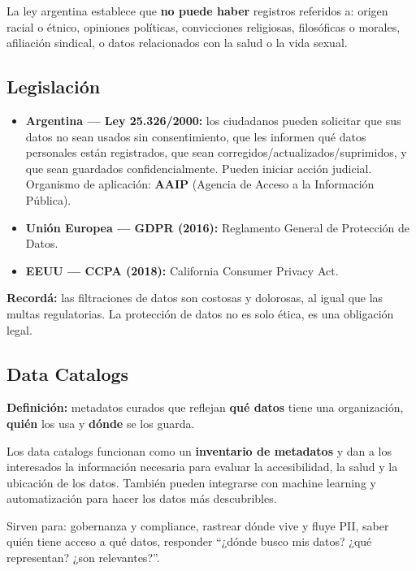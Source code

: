\documentclass[11pt, a4paper]{article}
\begin{document}
La ley argentina establece que \textbf{no puede haber} registros referidos a: origen racial o étnico, opiniones políticas, convicciones religiosas, filosóficas o morales, afiliación sindical, o datos relacionados con la salud o la vida sexual.

\subsection{Legislación}

\begin{itemize}
	\item \textbf{Argentina --- Ley 25.326/2000:} los ciudadanos pueden solicitar que sus datos no sean usados sin consentimiento, que les informen qué datos personales están registrados, que sean corregidos/actualizados/suprimidos, y que sean guardados confidencialmente. Pueden iniciar acción judicial. Organismo de aplicación: \textbf{AAIP} (Agencia de Acceso a la Información Pública).
	\item \textbf{Unión Europea --- GDPR (2016):} Reglamento General de Protección de Datos.
	\item \textbf{EEUU --- CCPA (2018):} California Consumer Privacy Act.
\end{itemize}

\begin{recallbox}
	\textbf{Recordá:} las filtraciones de datos son costosas y dolorosas, al igual que las multas regulatorias. La protección de datos no es solo ética, es una obligación legal.
\end{recallbox}

\subsection{Data Catalogs}

\textbf{Definición:} metadatos curados que reflejan \textbf{qué datos} tiene una organización, \textbf{quién} los usa y \textbf{dónde} se los guarda.

Los data catalogs funcionan como un \textbf{inventario de metadatos} y dan a los interesados la información necesaria para evaluar la accesibilidad, la salud y la ubicación de los datos. También pueden integrarse con machine learning y automatización para hacer los datos más descubribles.

Sirven para: gobernanza y compliance, rastrear dónde vive y fluye PII, saber quién tiene acceso a qué datos, responder ``¿dónde busco mis datos? ¿qué representan? ¿son relevantes?''.
\end{document}

